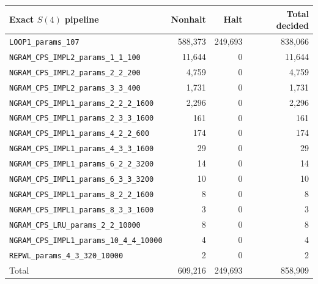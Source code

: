 \documentclass[letterpaper,british,11pt]{article}
\theoremstyle{definition} %
\numberwithin{equation}{section}
\theoremstyle{definition} %
\begin{document}
\begin{table}[h!]
    \centering
    \scriptsize
    \begin{tabular}{|lrrr|}
        \hline
        Exact $S(4)$ pipeline                               & Nonhalt   & Halt      & Total decided \\
        \hline
        \texttt{LOOP1\_params\_107}                         & 588{,}373 & 249{,}693 & 838{,}066     \\
        \texttt{NGRAM\_CPS\_IMPL2\_params\_1\_1\_100}       & 11{,}644  & 0         & 11{,}644      \\
        \texttt{NGRAM\_CPS\_IMPL2\_params\_2\_2\_200}       & 4{,}759   & 0         & 4{,}759       \\
        \texttt{NGRAM\_CPS\_IMPL2\_params\_3\_3\_400}       & 1{,}731   & 0         & 1{,}731       \\
        \texttt{NGRAM\_CPS\_IMPL1\_params\_2\_2\_2\_1600}   & 2{,}296   & 0         & 2{,}296       \\
        \texttt{NGRAM\_CPS\_IMPL1\_params\_2\_3\_3\_1600}   & 161       & 0         & 161           \\
        \texttt{NGRAM\_CPS\_IMPL1\_params\_4\_2\_2\_600}    & 174       & 0         & 174           \\
        \texttt{NGRAM\_CPS\_IMPL1\_params\_4\_3\_3\_1600}   & 29        & 0         & 29            \\
        \texttt{NGRAM\_CPS\_IMPL1\_params\_6\_2\_2\_3200}   & 14        & 0         & 14            \\
        \texttt{NGRAM\_CPS\_IMPL1\_params\_6\_3\_3\_3200}   & 10        & 0         & 10            \\
        \texttt{NGRAM\_CPS\_IMPL1\_params\_8\_2\_2\_1600}   & 8         & 0         & 8             \\
        \texttt{NGRAM\_CPS\_IMPL1\_params\_8\_3\_3\_1600}   & 3         & 0         & 3             \\
        \texttt{NGRAM\_CPS\_LRU\_params\_2\_2\_10000}       & 8         & 0         & 8             \\
        \texttt{NGRAM\_CPS\_IMPL1\_params\_10\_4\_4\_10000} & 4         & 0         & 4             \\
        \texttt{REPWL\_params\_4\_3\_320\_10000}            & 2         & 0         & 2             \\
        \hline
        Total                                               & 609{,}216 & 249{,}693 & 858{,}909     \\
        \hline
    \end{tabular}
\end{table}
\end{document}
